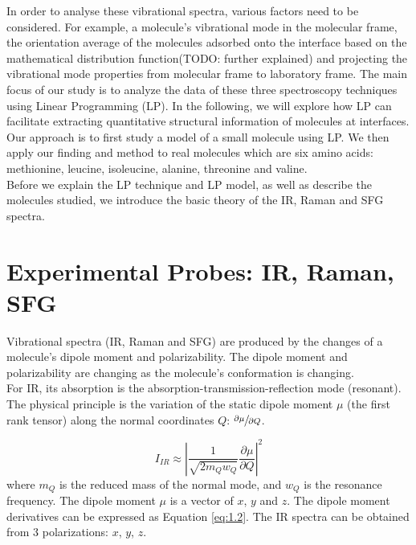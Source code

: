 In order to analyse these vibrational spectra, various factors need to be considered. For example, a molecule's vibrational mode in the molecular frame, the orientation average of the molecules adsorbed onto the interface based on the mathematical distribution function(TODO: further explained) and projecting the vibrational mode properties from molecular frame to laboratory frame. The main focus of our study is to analyze the data of these three spectroscopy techniques using Linear Programming (LP). In the following, we will explore how LP can facilitate extracting quantitative structural information of molecules at interfaces.\\

Our approach is to first study a model of a small molecule using LP. We then apply our finding and method to real molecules which are six amino acids: methionine, leucine, isoleucine, alanine, threonine and valine.\\

Before we explain the LP technique and LP model, as well as describe the molecules studied, we introduce the basic theory of  the IR, Raman and SFG spectra.\\

\section{Experimental Probes: IR, Raman, SFG}
Vibrational spectra (IR, Raman and SFG) are produced by the changes of a molecule's dipole moment and polarizability. The dipole moment and polarizability are changing as the molecule's conformation is changing. \\

For IR, its absorption is the absorption-transmission-reflection mode (resonant). The physical principle is the variation of the static dipole moment $\mu$ (the first rank tensor) along the normal coordinates $Q$: $\sfrac{\partial\mu}{\partial Q}$. 

\begin{equation} \label{eq:1.1}
I_{IR} \approx \left| \frac{1}{\sqrt{2m_{Q}w_{Q}}} \frac{\partial\mu}{\partial Q} \right|^{2}
\end{equation}
where $m_{Q}$ is the reduced mass of the normal mode, and $w_{Q}$ is the resonance frequency. The dipole moment $\mu$ is a vector of $x$, $y$ and $z$. The dipole moment derivatives can be expressed as Equation \ref{eq:1.2}. The IR spectra can be obtained from 3 polarizations: $x$, $y$, $z$. 

